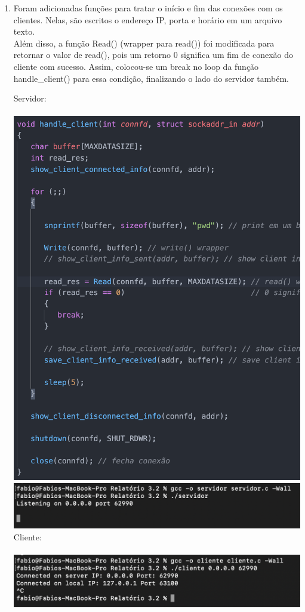 \documentclass[12pt,a4paper]{report}
\begin{document}
\begin{enumerate}
    \item Foram adicionadas funções para tratar o início e fim das conexões com os clientes. Nelas, são escritos o endereço IP, porta e horário em um arquivo texto.
    \\
    Além disso, a função Read() (wrapper para read()) foi modificada para retornar o valor de read(), pois um retorno 0 significa um fim de conexão do cliente com sucesso. Assim, colocou-se um break no loop da função handle\_client() para essa condição, finalizando o lado do servidor também.
    
    Servidor:\\\\
    \includegraphics[width=13cm]{images/ex3-servidor-codigo.png}
    \includegraphics[width=13cm]{images/ex3-servidor-execucao.png}\\
    Cliente:\\\\
    \includegraphics[width=13cm]{images/ex3-cliente-execucao.png}
    

\end{enumerate}
\end{document}
